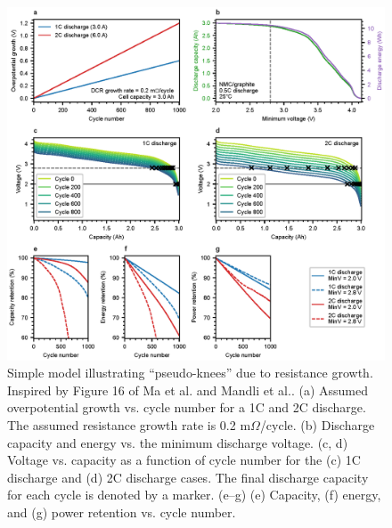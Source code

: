 \documentclass[journal=jpcl, manuscript=article, layout=onecolumn]{achemso}
\begin{document}
\begin{figure}[ht]
\centering
\includegraphics[scale = 0.9]{figures/dcr_growth_knee_2.eps}
\caption{Simple model illustrating ``pseudo-knees'' due to resistance growth. Inspired by Figure 16 of Ma et al.\cite{ma_editors_2019} and Mandli et al.\cite{mandli_analysis_2019}. (a) Assumed overpotential growth vs. cycle number for a 1C and 2C discharge. The assumed resistance growth rate is 0.2 m$\Omega$/cycle. (b) Discharge capacity and energy vs. the minimum discharge voltage. (c, d) Voltage vs. capacity as a function of cycle number for the (c) 1C discharge and (d) 2C discharge cases. The final discharge capacity for each cycle is denoted by a marker. (e--g) (e) Capacity, (f) energy, and (g) power retention vs. cycle number.
}
\label{fig:dcr_knee}
\end{figure}
\end{document}
